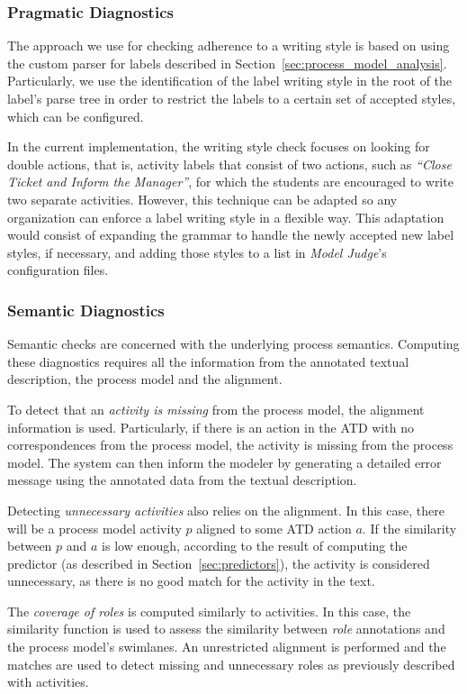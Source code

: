 \subsubsection*{Pragmatic Diagnostics}
The approach we use for checking adherence to a writing style is based on
using the custom  parser for labels described in
Section~\ref{sec:process_model_analysis}. Particularly, we use the
identification of the label writing style in the root of the label's parse tree
in order to restrict the labels to a certain set of accepted styles, which can
be configured.

In the current implementation, the writing style check focuses on looking
for double actions, that is, activity labels that consist of two actions, such
as \textit{``Close Ticket and Inform the Manager''}, for which the students are
encouraged to write two separate activities. However, this technique can be
adapted so any organization can enforce a label writing style in a flexible way.
This adaptation would consist of expanding the grammar to handle the newly
accepted new label styles, if necessary, and adding those styles to a list in
\textit{Model Judge}'s configuration files.

\subsubsection*{Semantic Diagnostics}
Semantic checks are concerned with the underlying process
semantics. Computing these diagnostics requires all the information from the
annotated textual description, the process model and the alignment.

To detect that an \emph{activity is missing} from the process model, the alignment
information is used. Particularly, if there is an action in the ATD with no
correspondences from the process model, the activity is missing from the process
model. The system can then inform the modeler by generating a detailed error
message using the annotated data from the textual description.

Detecting \emph{unnecessary activities} also relies on the alignment. In this case,
there will be a process model activity $p$ aligned to some ATD action $a$. If the
similarity between $p$ and $a$ is low enough, according to the result of
computing the predictor (as described in Section~\ref{sec:predictors}), the
activity is considered unnecessary, as there is no good match for the activity
in the text.

The \emph{coverage of roles} is computed similarly to activities. In this case, the
similarity function is used to assess the similarity between \emph{role}
annotations and the process model's swimlanes. An unrestricted alignment is
performed and the matches are used to detect missing and unnecessary roles as
previously described with activities.

